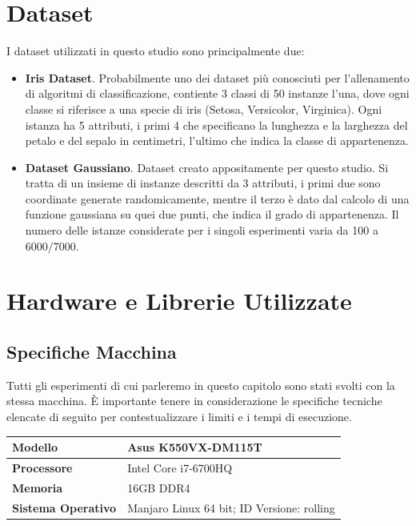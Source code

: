 \documentclass[a4paper,12pt]{report}
\begin{document}
\section{Dataset}
I dataset utilizzati in questo studio sono principalmente due:
\begin{itemize}
    \item \textbf{Iris Dataset}. Probabilmente uno dei dataset più conosciuti per l'allenamento di algoritmi di classificazione, contiente 3 classi di 50 instanze l'una, dove ogni classe si riferisce a una specie di iris (Setosa, Versicolor, Virginica). Ogni istanza ha 5 attributi, i primi 4 che specificano la lunghezza e la larghezza del petalo e del sepalo in centimetri, l'ultimo che indica la classe di appartenenza. 
    \item \textbf{Dataset Gaussiano}. Dataset creato appositamente per questo studio. Si tratta di un insieme di instanze descritti da 3 attributi, i primi due sono coordinate generate randomicamente, mentre il terzo è dato dal calcolo di una funzione gaussiana su quei due punti, che indica il grado di appartenenza. Il numero delle istanze considerate per i singoli esperimenti varia da 100 a 6000/7000.
\end{itemize}

\section{Hardware e Librerie Utilizzate}
\subsection*{Specifiche Macchina}
Tutti gli esperimenti di cui parleremo in questo capitolo sono stati svolti con la stessa macchina. \`E importante tenere in considerazione le specifiche tecniche elencate di seguito per contestualizzare i limiti e i tempi di esecuzione. 
\smallskip

\begin{center}
    \begin{tabular}{|l|l|}
        \hline 
        \textbf{Modello} & Asus K550VX-DM115T \\
        \hline
        \textbf{Processore} & Intel Core i7-6700HQ \\
        \hline
        \textbf{Memoria} & 16GB DDR4 \\
        \hline
        \textbf{Sistema Operativo} & Manjaro Linux 64 bit; ID Versione: rolling \\
        \hline
    \end{tabular}
\end{center}
\end{document}
